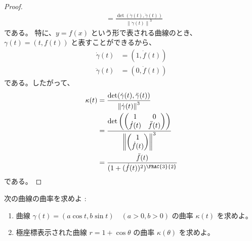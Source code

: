 \documentclass[article,paper=a4paper]{jlreq}
\begin{document}
\begin{proof}
\begin{align*}
        &= \frac{\det(\dot{\gamma}(t), \ddot{\gamma}(t))}{\left\|\dot{\gamma}(t)\right\|^3}
    \end{align*}
    である。
    特に、$y = f(x)$ という形で表される曲線のとき、$\gamma(t) = (t, f(t))$ と表すことができるから、
    \begin{align*}
        \dot{\gamma}(t) &= (1, \dot{f}(t))\\
        \ddot{\gamma}(t) &= (0, \ddot{f}(t))
    \end{align*}    
    である。したがって、
    \begin{align*}
        \kappa(t) &= \frac{\det(\dot{\gamma}(t), \ddot{\gamma}(t))}{\left\|\dot{\gamma}(t)\right\|^3} \\
        &= \frac{\det\left(\begin{pmatrix}
        1 & 0\\
        \dot{f}(t) & \ddot{f}(t)
        \end{pmatrix}\right)}{\left\|\begin{pmatrix}    1 \\ \dot{f}(t)\end{pmatrix}\right\|^3} \\
        &= \frac{\ddot{f}(t)}{(1 + (\dot{f}(t))^2)^{\FRAC{3}{2}}}
    \end{align*}
    である。
\end{proof}

\begin{prob}
    次の曲線の曲率を求めよ :
    \begin{enumerate}[label=(\arabic*)\,]
        \item 曲線 $\gamma(t) = (a\cos t, b\sin t) \quad (a > 0, b > 0)$ の曲率 $\kappa(t)$ を求めよ。
        \item 極座標表示された曲線 $r = 1 + \cos \theta$ の曲率 $\kappa(\theta)$ を求めよ。
    \end{enumerate}
\end{prob}
\end{document}
